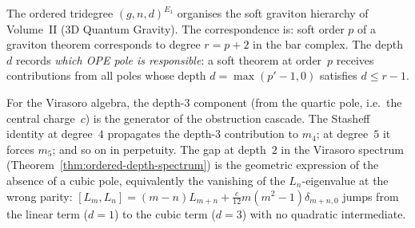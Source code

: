 \begin{remark}
\label{rem:tridegree-physical}
The ordered tridegree $(g,n,d)^{E_1}$ organises the soft graviton
hierarchy of Volume~II (3D Quantum Gravity). The correspondence is:
soft order $p$ of a graviton theorem corresponds to degree
$r = p + 2$ in the bar complex. The depth~$d$ records
\emph{which OPE pole is responsible}: a soft theorem at order~$p$
receives contributions from all poles whose depth
$d = \max(p'-1,0)$ satisfies $d \leq r - 1$.

For the Virasoro algebra, the depth-$3$ component
(from the quartic pole, i.e.\ the central charge~$c$) is the
generator of the obstruction cascade. The
Stasheff identity at degree~$4$ propagates the depth-$3$
contribution to $m_4$; at degree~$5$ it forces $m_5$;
and so on in perpetuity. The gap at depth~$2$ in the Virasoro
spectrum (Theorem~\ref{thm:ordered-depth-spectrum}) is the
geometric expression of the absence of a cubic pole,
equivalently the vanishing of the $L_n$-eigenvalue at the wrong
parity: $[L_m, L_n] = (m-n)L_{m+n} + \frac{c}{12}m(m^2-1)\delta_{m+n,0}$
jumps from the linear term ($d = 1$) to the cubic term ($d = 3$)
with no quadratic intermediate.
\end{remark}


